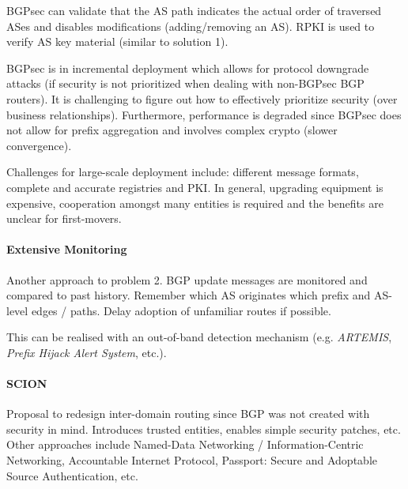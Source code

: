 BGPsec can validate that the AS path indicates the actual order of traversed ASes and disables modifications (adding/removing an AS). RPKI is used to verify AS key material (similar to solution 1).

BGPsec is in incremental deployment which allows for protocol downgrade attacks (if security is not prioritized when dealing with non-BGPsec BGP routers). It is challenging to figure out how to effectively prioritize security (over business relationships). Furthermore, performance is degraded since BGPsec does not allow for prefix aggregation and involves complex crypto (slower convergence).

Challenges for large-scale deployment include: different message formats, complete and accurate registries and PKI. In general, upgrading equipment is expensive, cooperation amongst many entities is required and the benefits are unclear for first-movers.

\paragraph{Extensive Monitoring}
Another approach to problem 2. BGP update messages are monitored and compared to past history. Remember which AS originates which prefix and AS-level edges / paths. Delay adoption of unfamiliar routes if possible.

This can be realised with an out-of-band detection mechanism (e.g. \textit{ARTEMIS}, \textit{Prefix Hijack Alert System}, etc.).

\paragraph{SCION}
Proposal to redesign inter-domain routing since BGP was not created with security in mind. Introduces trusted entities, enables simple security patches, etc. Other approaches include Named-Data Networking / Information-Centric Networking, Accountable Internet Protocol, Passport: Secure and Adoptable Source Authentication, etc.
